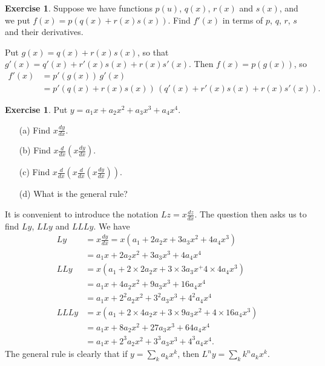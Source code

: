 \documentclass[a4paper]{book}
\newcommand{\tm}        {\times}
\renewcommand{\:}{\colon}
\theoremstyle{definition}
\newtheorem{exercise}[theorem]{Exercise}
\renewenvironment{solution}{\SolutionInline}{\endSolutionInline}
\begin{document}
\begin{exercise}
 Suppose we have functions $p(u)$, $q(x)$, $r(x)$ and $s(x)$, and we
 put $f(x)=p(q(x)+r(x)s(x))$.  Find $f'(x)$ in terms of $p$, $q$, $r$,
 $s$ and their derivatives.
\end{exercise}
\begin{solution}
 Put $g(x)=q(x)+r(x)s(x)$, so that $g'(x)=q'(x)+r'(x)s(x)+r(x)s'(x)$.
 Then $f(x)=p(g(x))$, so
 \begin{align*}
  f'(x) &= p'(g(x))\, g'(x) \\
        &= p'(q(x)+r(x)s(x))\, (q'(x) + r'(x)s(x) + r(x)s'(x)).
 \end{align*}
\end{solution}

\begin{exercise}
 Put $y= a_1x+a_2x^2+a_3x^3+a_4x^4$.
 \begin{itemize}
  \item[(a)] Find $x\frac{dy}{dx}$.
  \item[(b)] Find $x\frac{d}{dx}\left(x\frac{dy}{dx}\right)$.
  \item[(c)] Find
   $x\frac{d}{dx}\left(x\frac{d}{dx}\left(x\frac{dy}{dx}\right)\right)$.
  \item[(d)] What is the general rule?
 \end{itemize}
\end{exercise}
\begin{solution}
 It is convenient to introduce the notation $Lz=x\frac{dz}{dx}$.  The
 question then asks us to find $Ly$, $LLy$ and $LLLy$.  We have
 \begin{align*}
  Ly   &= x\frac{dy}{dx} = x(a_1+2a_2x+3a_3x^2+4a_4x^3) \\
       &= a_1x + 2a_2x^2 + 3a_3x^3 + 4a_4x^4 \\
  LLy  &= x(a_1 + 2\tm 2a_2x + 3\tm 3a_3x^ + 4\tm 4a_4x^3) \\
       &= a_1x + 4a_2x^2 + 9 a_3x^3 + 16a_4x^4 \\
       &= a_1x + 2^2a_2x^2 + 3^2 a_3x^3 + 4^2a_4x^4 \\
  LLLy &= x(a_1 + 2\tm 4a_2x + 3\tm 9a_3x^2 + 4\tm 16a_4x^3) \\
       &= a_1x + 8a_2x^2 + 27 a_3x^3 + 64a_4x^4 \\
       &= a_1x + 2^3a_2x^2 + 3^3 a_3x^3 + 4^3a_4x^4.
 \end{align*}
 The general rule is clearly that if $y=\sum_ka_kx^k$, then
 $L^ny=\sum_kk^na_kx^k$. 
\end{solution}
\end{document}
